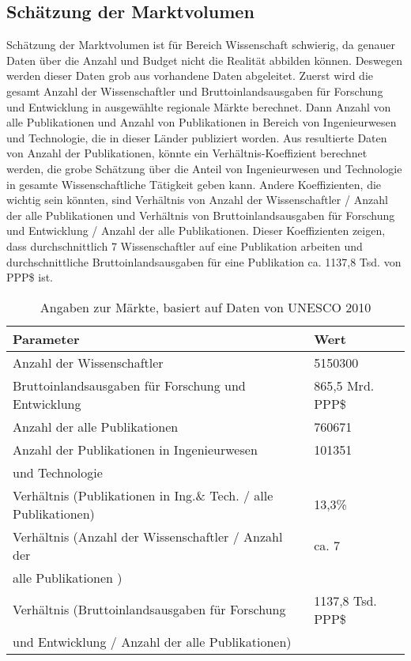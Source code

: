 \subsection{Schätzung der Marktvolumen}
Schätzung der Marktvolumen ist für Bereich Wissenschaft schwierig, da genauer Daten über die Anzahl und Budget nicht die Realität abbilden können. Deswegen werden dieser Daten grob aus vorhandene Daten abgeleitet. Zuerst wird die gesamt Anzahl der Wissenschaftler und Bruttoinlandsausgaben für Forschung und Entwicklung in ausgewählte regionale Märkte berechnet. Dann Anzahl von alle Publikationen und Anzahl von Publikationen in Bereich von Ingenieurwesen und Technologie, die in dieser Länder publiziert worden. Aus resultierte Daten von Anzahl der Publikationen, könnte ein Verhältnis-Koeffizient berechnet werden, die grobe Schätzung über die Anteil von Ingenieurwesen und Technologie in gesamte Wissenschaftliche Tätigkeit geben kann. Andere Koeffizienten, die wichtig sein könnten, sind Verhältnis von Anzahl der Wissenschaftler / Anzahl der alle Publikationen und Verhältnis von Bruttoinlandsausgaben für Forschung und Entwicklung / Anzahl der alle Publikationen. Dieser Koeffizienten zeigen, dass durchschnittlich 7 Wissenschaftler auf eine Publikation arbeiten und durchschnittliche Bruttoinlandsausgaben für eine Publikation ca. 1137,8 Tsd. von PPP\$ ist.
\begin{table}[h]
  \centering
  \begin{tabular}{|l|l|}\hline
   \textbf{Parameter} &  \textbf{Wert} \\ \hline
  Anzahl der Wissenschaftler & 5150300 \\ \hline
  Bruttoinlandsausgaben für Forschung und Entwicklung & 865,5 Mrd. PPP\$ \\ \hline
  Anzahl der alle Publikationen & 760671 \\ \hline
  Anzahl der Publikationen in Ingenieurwesen & 101351
 \\
  und Technologie& \\ \hline
  Verhältnis (Publikationen in Ing.\& Tech. / alle Publikationen) & 13,3\% \\ \hline
  Verhältnis (Anzahl der Wissenschaftler / Anzahl der & ca. 7 \\
  alle Publikationen ) & \\ \hline
  Verhältnis (Bruttoinlandsausgaben für Forschung & 1137,8 Tsd. PPP\$\\
  und Entwicklung / Anzahl der alle Publikationen) & \\ \hline
  \end{tabular}
  \caption{Angaben zur Märkte, basiert auf Daten von UNESCO 2010}
  \label{tab:ABC3}
\end{table} 

